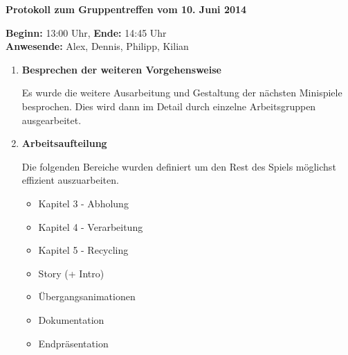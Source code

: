 \documentclass[a4paper]{article}
\newcommand{\changefont}[3]{
\fontfamily{#1} \fontseries{#2} \fontshape{#3} \selectfont}
\newcommand{\TOP}[1]{\item \textbf{#1}\par}
\begin{document}
\changefont{cmss}{m}{n} %


\begin{center}
\textbf{\Large Protokoll zum Gruppentreffen vom 10. Juni 2014}
\end{center}
\vspace{3mm}

\textbf{Beginn:} 13:00 Uhr, \textbf{Ende:} 14:45 Uhr\\
\textbf{Anwesende:} Alex, Dennis, Philipp, Kilian

\vspace{5mm}

\begin{enumerate}


\TOP{Besprechen der weiteren Vorgehensweise}

Es wurde die weitere Ausarbeitung und Gestaltung der nächsten Minispiele besprochen. Dies wird dann im Detail durch einzelne Arbeitsgruppen ausgearbeitet.

\TOP{Arbeitsaufteilung}

Die folgenden Bereiche wurden definiert um den Rest des Spiels möglichst effizient auszuarbeiten.

\begin{itemize}
\item Kapitel 3 - Abholung
\item Kapitel 4 - Verarbeitung
\item Kapitel 5 - Recycling
\item Story (+ Intro)
\item Übergangsanimationen
\item Dokumentation
\item Endpräsentation
\end{itemize}



\end{enumerate}


\makeatletter
\def\footrule{{
  \vskip-\footruleskip\vskip-\footrulewidth
  \color{\footrulecolor}
  \hrule\@width\headwidth\@height
  \footrulewidth\vskip\footruleskip
}}
\makeatother
\renewcommand{\footrulewidth}{3pt}
\newcommand{\footrulecolor}{dgreen}
\end{document}
